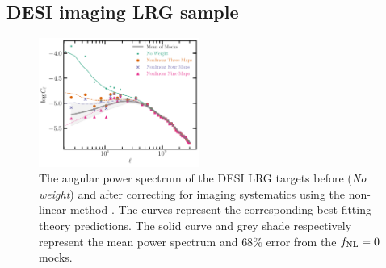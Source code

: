 \subsection{DESI imaging LRG sample}
\begin{figure}
    \centering
    \includegraphics[width=0.47\textwidth]{figures/model_dr9.pdf} 
    \caption{The angular power spectrum of the DESI LRG targets before (\textit{No weight}) and after correcting for imaging systematics using the  non-linear method . The curves represent the corresponding best-fitting theory predictions. The solid curve and grey shade respectively represent the mean power spectrum and $68\%$ error from the $f_{\rm NL}=0$ mocks. }
    \label{fig:cl_dr9}
\end{figure}
